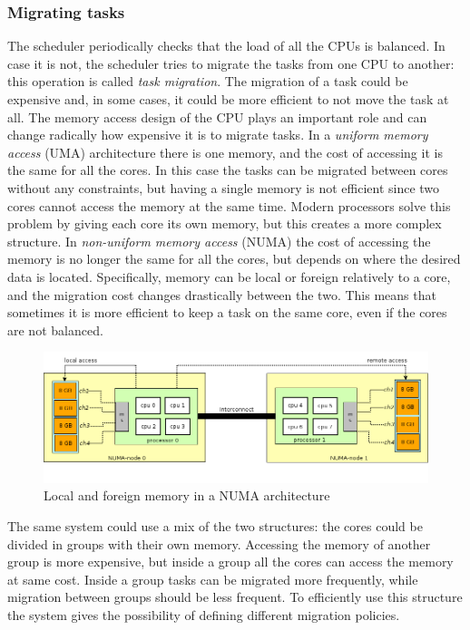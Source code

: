 \subsubsection{Migrating tasks}
The scheduler periodically checks that the load of all the CPUs is balanced. In case it is not, the scheduler tries to migrate the tasks from one CPU to another: this operation is called \textit{task migration}. The migration of a task could be expensive and, in some cases, it could be more efficient to not move the task at all. The memory access design of the CPU plays an important role and can change radically how expensive it is to migrate tasks. In a \textit{uniform memory access} (UMA) architecture there is one memory, and the cost of accessing it is the same for all the cores. In this case the tasks can be migrated between cores without any constraints, but having a single memory is not efficient since two cores cannot access the memory at the same time. Modern processors solve this problem by giving each core its own memory, but this creates a more complex structure. In \textit{non-uniform memory access} (NUMA) the cost of accessing the memory is no longer the same for all the cores, but depends on where the desired data is located. Specifically, memory can be local or foreign relatively to a core, and the migration cost changes drastically between the two. This means that sometimes it is more efficient to keep a task on the same core, even if the cores are not balanced. 

\begin{figure}[ht]
\includegraphics[width=\textwidth]{images/numa.png}
\caption{Local and foreign memory in a NUMA architecture}
\label{img:numa}
\end{figure}
The same system could use a mix of the two structures: the cores could be divided in groups with their own memory. Accessing the memory of another group is more expensive, but inside a group all the cores can access the memory at same cost. Inside a group tasks can be migrated more frequently, while migration between groups should be less frequent. To efficiently use this structure the system gives the possibility of defining different migration policies.

